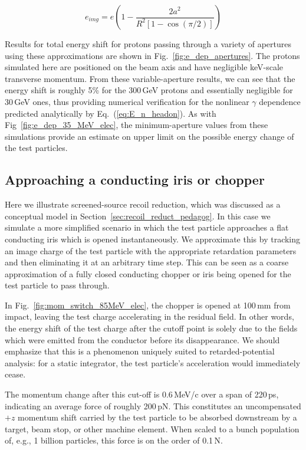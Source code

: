 \documentclass[reprint,
               amsmath,amssymb,nofootinbib, aps%
              ]{revtex4-2}
\begin{document}
\begin{equation}
    e_{img} = e\left( 1- \frac{2 a^2}{R^2\left[1 - \operatorname{cos}(\pi / 2)\right]} \right)
    \label{eq:image_charge_fraction}
\end{equation}

Results for total energy shift for protons passing through a variety of apertures using these approximations are shown in Fig.~\ref{fig:e_dep_apertures}. The protons simulated here are positioned on the beam axis and have negligible keV-scale transverse momentum. From these variable-aperture results, we can see that the energy shift is roughly 5\% for the 300\,GeV protons and essentially negligible for 30\,GeV ones, thus providing numerical verification for the nonlinear $\gamma$ dependence predicted analytically by Eq.~(\ref{eq:E_n_headon}). %
 As with Fig~\ref{fig:e_dep_35_MeV_elec}, the minimum-aperture values from these simulations provide an estimate on upper limit on the possible energy change of the test particles. 


\subsection{Approaching a conducting iris or chopper}\label{sec:results_conducting_surface}
Here we illustrate screened-source recoil reduction, which was discussed as a conceptual model in Section~\ref{sec:recoil_reduct_pedagog}. In this case we simulate a more simplified scenario in which the test particle approaches a flat conducting iris which is opened instantaneously. We approximate this by tracking an image charge of the test particle with the appropriate retardation parameters and then eliminating it at an arbitrary time step. This can be seen as a coarse approximation of a fully closed conducting chopper or iris being opened for the test particle to pass through.

In Fig.~\ref{fig:mom_switch_85MeV_elec}, the chopper is opened at 100\,mm from impact, leaving the test charge accelerating in the residual field. In other words, the energy shift of the test charge after the cutoff point is solely due to the fields which were emitted from the conductor before its disappearance. We should emphasize that this is a phenomenon uniquely suited to retarded-potential analysis: for a static integrator, the test particle's acceleration would immediately cease. 

The momentum change after this cut-off is 0.6\,MeV/c over a span of 220\,ps, indicating an average force of roughly 200\,pN. This constitutes an uncompensated $+z$ momentum shift carried by the test particle to be absorbed downstream by a target, beam stop, or other machine element. When scaled to a bunch population of, e.g., 1 billion particles, this force is on the order of 0.1\,N. %
\vspace{-0.25cm}
\end{document}
